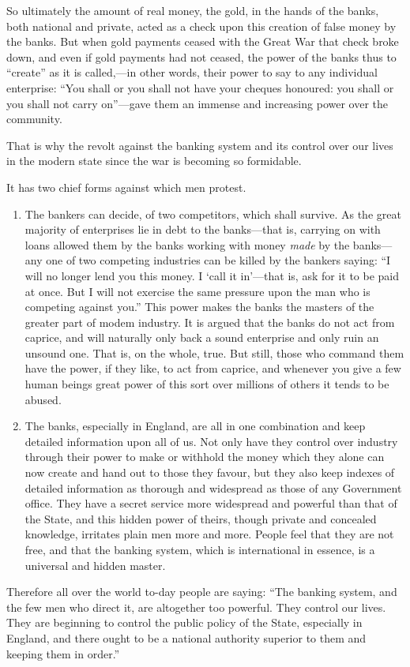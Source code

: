\documentclass{book}
\begin{document}
So ultimately the amount of real money, the gold, in the hands of the banks, both national and private, acted as a check upon this creation of false money by the banks. But when gold payments ceased with the Great War that check broke down, and even if gold payments had not ceased, the power of the banks thus to “create” as it is called,—in other words, their power to say to any individual enterprise: “You shall or you shall not have your cheques honoured: you shall or you shall not carry on”—gave them an immense and increasing power over the community.

That is why the revolt against the banking system and its control over our lives in the modern state since the war is becoming so formidable.

It has two chief forms against which men protest.

\begin{enumerate}
	\item The bankers can decide, of two competitors, which shall survive. As the great majority of enterprises lie in debt to the banks—that is, carrying on with loans allowed them by the banks working with money \emph{made} by the banks—any one of two competing industries can be killed by the bankers saying: “I will no longer lend you this money. I ‘call it in’—that is, ask for it to be paid at once. But I will not exercise the same pressure upon the man who is competing against you.” This power makes the banks the masters of the greater part of modem industry. It is argued that the banks do not act from caprice, and will naturally only back a sound enterprise and only ruin an unsound one. That is, on the whole, true. But still, those who command them have the power, if they like, to act from caprice, and whenever you give a few human beings great power of this sort over millions of others it tends to be abused.


	\item The banks, especially in England, are all in one combination and keep detailed information upon all of us. Not only have they control over industry through their power to make or withhold the money which they alone can now create and hand out to those they favour, but they also keep indexes of detailed information as thorough and widespread as those of any Government office. They have a secret service more widespread and powerful than that of the State, and this hidden power of theirs, though private and concealed knowledge, irritates plain men more and more. People feel that they are not free, and that the banking system, which is international in essence, is a universal and hidden master.



\end{enumerate}
Therefore all over the world to-day people are saying: “The banking system, and the few men who direct it, are altogether too powerful. They control our lives. They are beginning to control the public policy of the State, especially in England, and there ought to be a national authority superior to them and keeping them in order.”
\end{document}
